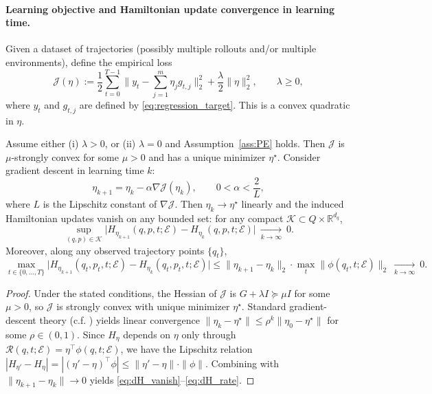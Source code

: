 \paragraph{Learning objective and Hamiltonian update convergence in learning time.}
Given a dataset of trajectories (possibly multiple rollouts and/or multiple environments), define the empirical loss
\begin{equation}
\label{eq:ls_loss_eta}
\mathcal J(\eta)
:=\frac12\sum_{t=0}^{T-1}\big\|y_t-\sum_{j=1}^m \eta_j g_{t,j}\big\|_2^2
+\frac{\lambda}{2}\|\eta\|_2^2,
\qquad \lambda\ge 0,
\end{equation}
where $y_t$ and $g_{t,j}$ are defined by \cref{eq:regression_target}. This is a convex quadratic in $\eta$.

\begin{theorem}
\label{thm:eta_convergence_dH}
Assume either (i) $\lambda>0$, or (ii) $\lambda=0$ and Assumption~\ref{ass:PE} holds.
Then $\mathcal J$ is $\mu$-strongly convex for some $\mu>0$ and has a unique minimizer $\eta^\star$.
Consider gradient descent in learning time $k$:
\[
\eta_{k+1}=\eta_k-\alpha\nabla \mathcal J(\eta_k),
\qquad 0<\alpha<\frac{2}{L},
\]
where $L$ is the Lipschitz constant of $\nabla\mathcal J$.
Then $\eta_k\to\eta^\star$ linearly and the induced Hamiltonian updates vanish on any bounded set:
for any compact $\mathcal K\subset Q\times \mathbb R^{d_q}$,
\begin{equation}
\label{eq:dH_vanish}
\sup_{(q,p)\in\mathcal K}\big|H_{\eta_{k+1}}(q,p,t;\mathcal E)-H_{\eta_k}(q,p,t;\mathcal E)\big|
\ \xrightarrow[k\to\infty]{}\ 0.
\end{equation}
Moreover, along any observed trajectory points $\{q_t\}$,
\begin{equation}
\label{eq:dH_rate}
\max_{t\in\{0,\dots,T\}}\big|H_{\eta_{k+1}}(q_t,p_t,t;\mathcal E)-H_{\eta_k}(q_t,p_t,t;\mathcal E)\big|
\le \|\eta_{k+1}-\eta_k\|_2 \cdot \max_t \|\phi(q_t,t;\mathcal E)\|_2
\ \xrightarrow[k\to\infty]{}\ 0.
\end{equation}
\end{theorem}

\begin{proof}
Under the stated conditions, the Hessian of $\mathcal J$ is $G+\lambda I\succeq \mu I$ for some $\mu>0$,
so $\mathcal J$ is strongly convex with unique minimizer $\eta^\star$. Standard gradient-descent theory (c.f. \citet{NocedalWright2006NumericalOptimization}) yields linear convergence
$\|\eta_k-\eta^\star\|\le \rho^k\|\eta_0-\eta^\star\|$ for some $\rho\in(0,1)$.
Since $H_\eta$ depends on $\eta$ only through $\mathcal R(q,t;\mathcal E)=\eta^\top\phi(q,t;\mathcal E)$,
we have the Lipschitz relation
$|H_{\eta'}-H_\eta|=|(\eta'-\eta)^\top\phi|\le \|\eta'-\eta\|\cdot \|\phi\|$.
Combining with $\|\eta_{k+1}-\eta_k\|\to 0$ yields \cref{eq:dH_vanish}--\cref{eq:dH_rate}.
\end{proof}

